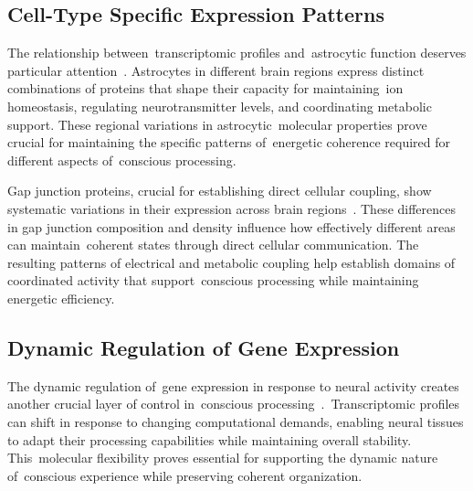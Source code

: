 \subsection*{Cell-Type Specific Expression Patterns~}

The relationship between~transcriptomic profiles and~astrocytic function deserves particular attention~\cite{Zhang2010, Verkhratsky2018}. Astrocytes in different brain regions express distinct combinations of proteins that shape their capacity for maintaining~ion homeostasis, regulating neurotransmitter levels, and coordinating metabolic support. These regional variations in astrocytic~molecular properties prove crucial for maintaining the specific patterns of~energetic coherence required for different aspects of~conscious processing.

Gap junction proteins, crucial for establishing direct cellular coupling, show systematic variations in their expression across brain regions~\cite{Yuste2020, Nagy2018}. These differences in gap junction composition and density influence how effectively different areas can maintain~coherent states through direct cellular communication. The resulting patterns of electrical and metabolic coupling help establish domains of coordinated activity that support~conscious processing while maintaining energetic efficiency.

\subsection*{Dynamic Regulation of Gene Expression~}

The dynamic regulation of~gene expression in response to neural activity creates another crucial layer of control in~conscious processing~\cite{Fishell2020, gershman2023molecular}.~Transcriptomic profiles can shift in response to changing computational demands, enabling neural tissues to adapt their processing capabilities while maintaining overall stability. This~molecular flexibility proves essential for supporting the dynamic nature of~conscious experience while preserving coherent organization.

